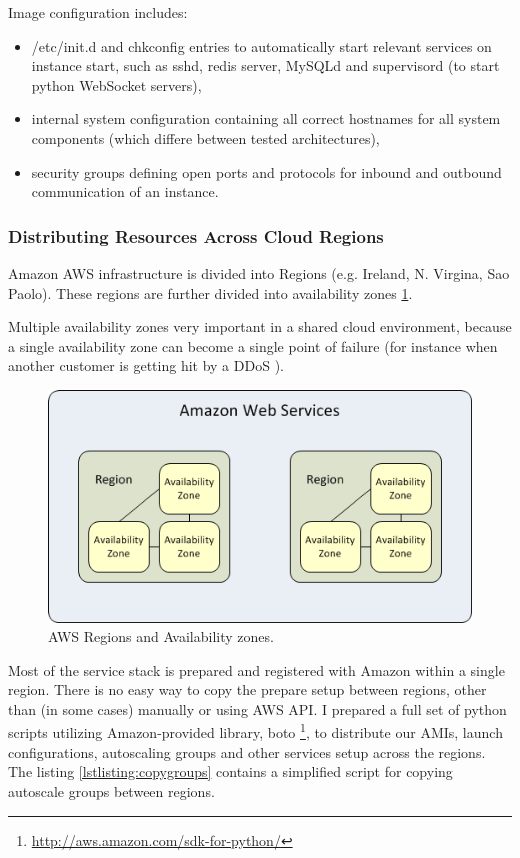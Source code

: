 \documentclass{uvamscse}
\begin{document}
Image configuration includes:
\begin{itemize}
  \item /etc/init.d and chkconfig entries to automatically start relevant services on instance start, such as sshd, redis server, MySQLd and supervisord (to start python WebSocket servers),
  \item internal system configuration containing all correct hostnames for all system components (which differe between tested architectures),
  \item security groups defining open ports and protocols for inbound and outbound communication of an instance.
\end{itemize}

\subsubsection{Distributing Resources Across Cloud Regions}

Amazon AWS infrastructure is divided into Regions (e.g. Ireland, N. Virgina, Sao Paolo). These regions are further divided into availability zones \ref{figure:awsregions}.


Multiple availability zones very important in a shared cloud environment, because a single availability zone can become a single point of failure (for instance when another customer is getting hit by a DDoS \cite{GroBuy}).


\begin{figure}[H]
\centering
\includegraphics[scale=0.8]{awsregions}
\caption{AWS Regions and Availability zones.}
\label{figure:awsregions}
\end{figure}

Most of the service stack is prepared and registered with Amazon within a single region. There is no easy way to copy the prepare setup between regions, other than (in some cases) manually or using AWS API. I prepared a full set of python scripts utilizing Amazon-provided library, boto \footnote{\url{http://aws.amazon.com/sdk-for-python/}}, to distribute our AMIs, launch configurations, autoscaling groups and other services setup across the regions. The listing \ref{lstlisting:copygroups} contains a simplified script for copying autoscale groups between regions.
\end{document}
